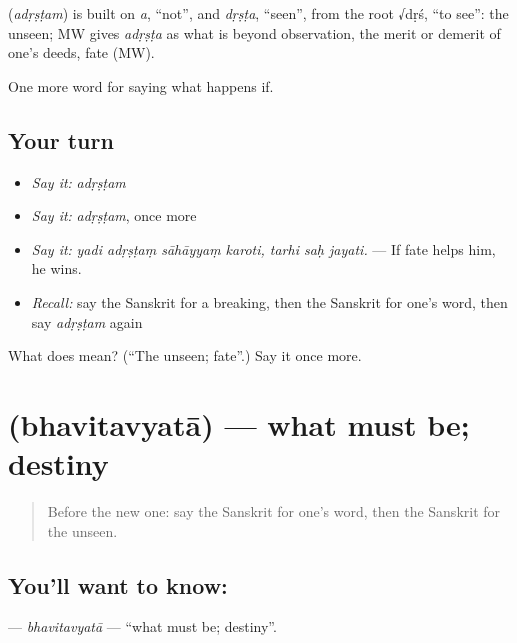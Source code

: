 \begin{cousinweb}
\textbf{} (\emph{adṛṣṭam}) is built on \emph{a}, \textquotedblleft{}not\textquotedblright{}, and \emph{dṛṣṭa}, \textquotedblleft{}seen\textquotedblright{}, from the root √dṛś, \textquotedblleft{}to see\textquotedblright{}: the unseen; MW gives \emph{adṛṣṭa} as what is beyond observation, the merit or demerit of one's deeds, fate (MW).
\end{cousinweb}

\begin{grammarlens}[title={What you've built}]
One more word for saying what happens if.
\end{grammarlens}

\subsection*{Your turn}
\begin{itemize}
\raggedright
  \item \emph{Say it:} \emph{adṛṣṭam}
  \item \emph{Say it:} \emph{adṛṣṭam}, once more
  \item \emph{Say it:} \emph{yadi adṛṣṭaṃ sāhāyyaṃ karoti, tarhi saḥ jayati.} — If fate helps him, he wins.
  \item \emph{Recall:} say the Sanskrit for a breaking, then the Sanskrit for one's word, then say \emph{adṛṣṭam} again
\end{itemize}

\begin{tcolorbox}[breakable,colback=teal!4,colframe=teal!35!black,title={Before you move on}]
What does  mean? (\textquotedblleft{}The unseen; fate\textquotedblright{}.) Say it once more.
\end{tcolorbox}
\section[\texorpdfstring{\sk{भवितव्यता} (bhavitavyatā)}{भवितव्यता (bhavitavyatā)}]{ (bhavitavyatā) — what must be; destiny}

\label{lesson:SA-C536-bhavitavyata}



\begin{quote}
Before the new one: say the Sanskrit for one's word, then the Sanskrit for the unseen.
\end{quote}

\subsection*{You'll want to know: }
\textbf{} — \emph{bhavitavyatā} — \textquotedblleft{}what must be; destiny\textquotedblright{}.

